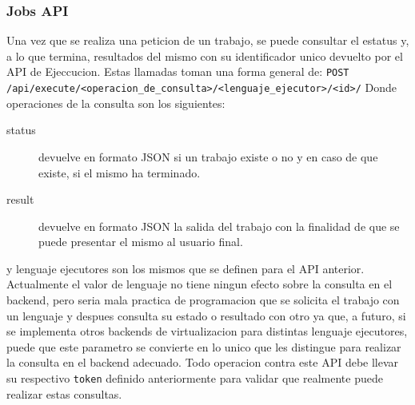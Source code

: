 \subsubsection{Jobs API}
Una vez que se realiza una peticion de un trabajo, se puede consultar el estatus y, a lo que termina, resultados del mismo con su identificador unico devuelto por el API de Ejeccucion. Estas llamadas toman una forma general de: \texttt{POST /api/execute/<operacion\_de\_consulta>/<lenguaje\_ejecutor>/<id>/}
Donde operaciones de la consulta son los siguientes:
\begin{description}
	\item[status] devuelve en formato JSON si un trabajo existe o no y en caso de que existe, si el mismo ha terminado.
    \item[result] devuelve en formato JSON la salida del trabajo con la finalidad de que se puede presentar el mismo al usuario final.
\end{description}
y lenguaje ejecutores son los mismos que se definen para el API anterior. Actualmente el valor de lenguaje no tiene ningun efecto sobre la consulta en el backend, pero seria mala practica de programacion que se solicita el trabajo con un lenguaje y despues consulta su estado o resultado con otro ya que, a futuro, si se implementa otros backends de virtualizacion para distintas lenguaje ejecutores, puede que este parametro se convierte en lo unico que les distingue para realizar la consulta en el backend adecuado. Todo operacion contra este API debe llevar su respectivo \texttt{token} definido anteriormente para validar que realmente puede realizar estas consultas.
